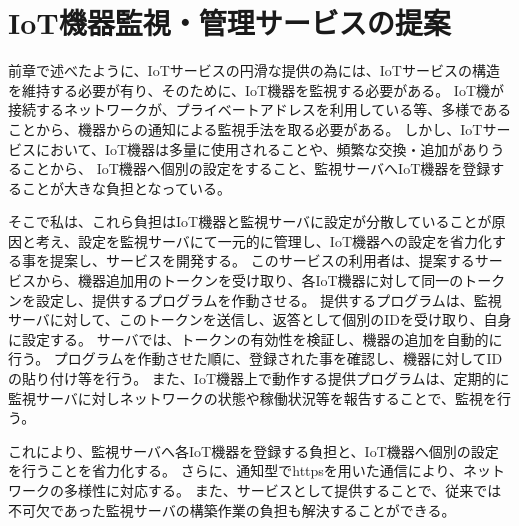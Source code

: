 \section{IoT機器監視・管理サービスの提案}
前章で述べたように、IoTサービスの円滑な提供の為には、IoTサービスの構造を維持する必要が有り、そのために、IoT機器を監視する必要がある。
IoT機が接続するネットワークが、プライベートアドレスを利用している等、多様であることから、機器からの通知による監視手法を取る必要がある。
しかし、IoTサービスにおいて、IoT機器は多量に使用されることや、頻繁な交換・追加がありうることから、
IoT機器へ個別の設定をすること、監視サーバへIoT機器を登録することが大きな負担となっている。

そこで私は、これら負担はIoT機器と監視サーバに設定が分散していることが原因と考え、設定を監視サーバにて一元的に管理し、IoT機器への設定を省力化する事を提案し、サービスを開発する。
このサービスの利用者は、提案するサービスから、機器追加用のトークンを受け取り、各IoT機器に対して同一のトークンを設定し、提供するプログラムを作動させる。
提供するプログラムは、監視サーバに対して、このトークンを送信し、返答として個別のIDを受け取り、自身に設定する。
サーバでは、トークンの有効性を検証し、機器の追加を自動的に行う。
プログラムを作動させた順に、登録された事を確認し、機器に対してIDの貼り付け等を行う。
また、IoT機器上で動作する提供プログラムは、定期的に監視サーバに対しネットワークの状態や稼働状況等を報告することで、監視を行う。

これにより、監視サーバへ各IoT機器を登録する負担と、IoT機器へ個別の設定を行うことを省力化する。
さらに、通知型でhttpsを用いた通信により、ネットワークの多様性に対応する。
また、サービスとして提供することで、従来では不可欠であった監視サーバの構築作業の負担も解決することができる。

